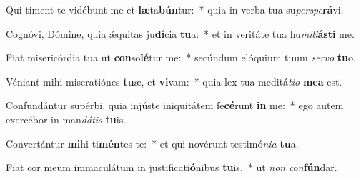 \item Qui timent te vidébunt me et \textbf{læ}ta\textbf{bún}tur:~* quia in verba tua su\textit{per}\textit{spe}\textbf{rá}vi.
\item Cognóvi, Dómine, quia ǽquitas ju\textbf{dí}cia \textbf{tu}a:~* et in veritáte tua hu\textit{mi}\textit{li}\textbf{ás}\textbf{ti} me.
\item Fiat misericórdia tua ut \textbf{con}so\textbf{lé}tur me:~* secúndum elóquium tuum \textit{ser}\textit{vo} \textbf{tu}o.
\item Véniant mihi miseratiónes \textbf{tu}æ, et \textbf{vi}vam:~* quia lex tua meditá\textit{ti}\textit{o} \textbf{me}\textbf{a} est.
\item Confundántur supérbi, quia injúste iniquitátem fe\textbf{cé}runt \textbf{in} me:~* ego autem exercébor in man\textit{dá}\textit{tis} \textbf{tu}is.
\item Convertántur \textbf{mi}hi ti\textbf{mén}tes te:~* et qui novérunt testimó\textit{ni}\textit{a} \textbf{tu}a.
\item Fiat cor meum immaculátum in justificati\textbf{ó}nibus \textbf{tu}is,~* ut \textit{non} \textit{con}\textbf{fún}dar.
